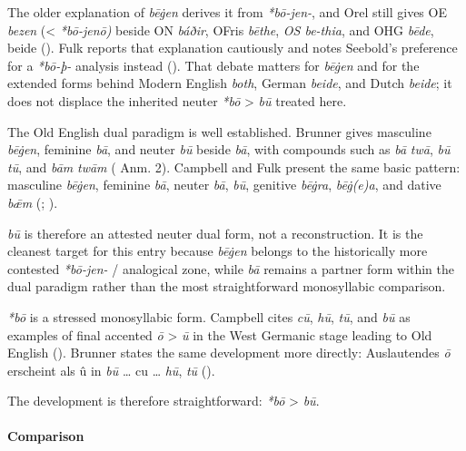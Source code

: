 \documentclass[
  british,
  a4paper,
]{article}
\begin{document}
The older explanation of \emph{bēġen} derives it from \emph{*bō-jen-},
and Orel still gives OE \emph{bezen} (\textless{} \emph{*bō-jenō)}
beside ON \emph{báðir}, OFris \emph{bēthe}, \emph{OS be-thia}, and OHG
\emph{bēde}, beide (). Fulk
reports that explanation cautiously and notes Seebold's preference for a
\emph{*bō-þ-} analysis instead (). That debate matters for \emph{bēġen} and for the extended forms
behind Modern English \emph{both}, German \emph{beide}, and Dutch
\emph{beide}; it does not displace the inherited neuter \emph{*bō}
\textgreater{} \emph{bū} treated here.

The Old English dual paradigm is well established. Brunner gives
masculine \emph{bēġen}, feminine \emph{bā}, and neuter \emph{bū} beside
\emph{bā}, with compounds such as \emph{bā} \emph{twā}, \emph{bū}
\emph{tū}, and \emph{bām} \emph{twām}
( Anm. 2).
Campbell and Fulk present the same basic pattern: masculine
\emph{bēġen}, feminine \emph{bā}, neuter \emph{bā}, \emph{bū}, genitive
\emph{bēġra}, \emph{bēġ(e)a}, and dative \emph{bǣm}
(;
).

\emph{bū} is therefore an attested neuter dual form, not a
reconstruction. It is the cleanest target for this entry because
\emph{bēġen} belongs to the historically more contested \emph{*bō-jen-}
/ analogical zone, while \emph{bā} remains a partner form within the
dual paradigm rather than the most straightforward monosyllabic
comparison.

\emph{*bō} is a stressed monosyllabic form. Campbell cites \emph{cū},
\emph{hū}, \emph{tū}, and \emph{bū} as examples of final accented
\emph{ō} \textgreater{} \emph{ū} in the West Germanic stage leading to
Old English ().
Brunner states the same development more directly: Auslautendes \emph{ō}
erscheint als û in \emph{bū} \ldots{} cu \ldots{} \emph{hū}, \emph{tū}
().

The development is therefore straightforward: \emph{*bō} \textgreater{}
\emph{bū}.

\paragraph{Comparison}\label{comparison}
\end{document}
